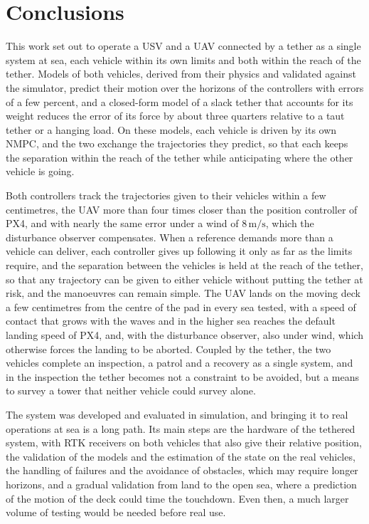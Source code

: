 \section{Conclusions}
\label{sec:concl}

This work set out to operate a USV and a UAV connected by a tether as a single system at sea, each vehicle within its own limits and both within the reach of the tether. Models of both vehicles, derived from their physics and validated against the simulator, predict their motion over the horizons of the controllers with errors of a few percent, and a closed-form model of a slack tether that accounts for its weight reduces the error of its force by about three quarters relative to a taut tether or a hanging load. On these models, each vehicle is driven by its own NMPC, and the two exchange the trajectories they predict, so that each keeps the separation within the reach of the tether while anticipating where the other vehicle is going.

Both controllers track the trajectories given to their vehicles within a few centimetres, the UAV more than four times closer than the position controller of PX4, and with nearly the same error under a wind of $8\,\text{m/s}$, which the disturbance observer compensates. When a reference demands more than a vehicle can deliver, each controller gives up following it only as far as the limits require, and the separation between the vehicles is held at the reach of the tether, so that any trajectory can be given to either vehicle without putting the tether at risk, and the manoeuvres can remain simple. The UAV lands on the moving deck a few centimetres from the centre of the pad in every sea tested, with a speed of contact that grows with the waves and in the higher sea reaches the default landing speed of PX4, and, with the disturbance observer, also under wind, which otherwise forces the landing to be aborted. Coupled by the tether, the two vehicles complete an inspection, a patrol and a recovery as a single system, and in the inspection the tether becomes not a constraint to be avoided, but a means to survey a tower that neither vehicle could survey alone.

The system was developed and evaluated in simulation, and bringing it to real operations at sea is a long path. Its main steps are the hardware of the tethered system, with RTK receivers on both vehicles that also give their relative position, the validation of the models and the estimation of the state on the real vehicles, the handling of failures and the avoidance of obstacles, which may require longer horizons, and a gradual validation from land to the open sea, where a prediction of the motion of the deck could time the touchdown. Even then, a much larger volume of testing would be needed before real use.
